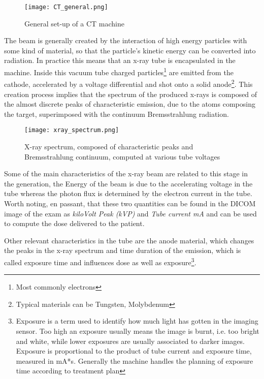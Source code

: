 \begin{figure}[H]
\centering
  		\texttt{[image: CT\_general.png]}
        \caption{General set-up of a CT machine\label{fig:CT-machine}}
\end{figure}

The beam is generally created by the interaction of high energy particles with some kind of material, so that the particle's kinetic energy can be converted into radiation. In practice this means that an x-ray tube is encapsulated in the machine. Inside this vacuum tube charged particles\footnote{Most commonly electrons} are emitted from the cathode, accelerated by a voltage differential and shot onto a solid anode\footnote{Typical materials can be Tungsten, Molybdenum}. This creation process implies that the spectrum of the produced x-rays is composed of the almost discrete peaks of characteristic emission, due to the atoms composing the target, superimposed with the continuum Bremsstrahlung radiation.

\begin{figure}[H]
		\centering
  		\texttt{[image: xray\_spectrum.png]}
        \caption{X-ray spectrum, composed of characteristic peaks and Bremsstrahlung	continuum, computed at various tube voltages\label{fig:x-ray spectrum}}
\end{figure}

Some of the main characteristics of the x-ray beam are related to this stage in the generation, the Energy of the beam is due to the accelerating voltage in the tube  whereas the photon flux is determined by the electron current in the tube. Worth noting, en passant, that these two quantities can be found in the DICOM image of the exam as \textit{kiloVolt Peak (kVP)} and \textit{Tube current mA} and can be used to compute the dose delivered to the patient.

Other relevant characteristics in the tube are the anode material, which changes the peaks in the x-ray spectrum and time duration of the emission, which is called exposure time and influences dose as well as exposure\footnote{Exposure is a term used to identify how much light has gotten in the imaging sensor. Too high an exposure usually means the image is burnt, i.e. too bright and white, while lower exposures are usually associated to darker images. Exposure is proportional to the product of tube current and exposure time, measured in mA*s. Generally the machine handles the planning of exposure time according to treatment plan}.

